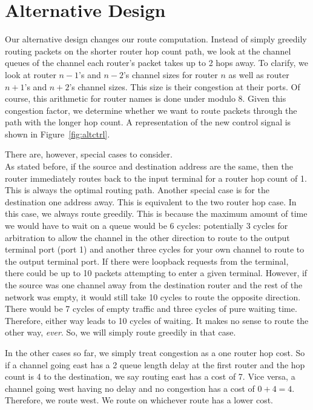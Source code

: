 \documentclass[10pt]{article}
\begin{document}
\section{Alternative Design}

Our alternative design changes our route computation. 
Instead of simply greedily routing packets on the shorter router hop count
path, we look at the channel queues of the channel each router's packet 
takes up to 2 hops away. 
To clarify, we look at router $n-1$'s and $n-2$'s channel sizes 
for router $n$ as well as router $n+1$'s and $n+2$'s channel sizes.
This size is their congestion at their ports. 
Of course, this arithmetic for router names is done under modulo 8. 
Given this congestion factor, we determine whether we want to route packets 
through the path with the longer hop count. 
A representation of the new control signal is shown in 
Figure~\ref{fig:altctrl}.\par

There are, however, special cases to consider. \\
As stated before, if the source and destination address are the same, then the
router immediately routes back to the input terminal for a router hop count 
of 1.
This is always the optimal routing path.
Another special case is for the destination one address away. 
This is equivalent to the two router hop case.
In this case, we always route greedily. 
This is because the maximum amount of time we would have to wait on a queue
would be 6 cycles: 
potentially 3 cycles for arbitration to allow the channel in the other 
direction to route to the output terminal port (port 1) and another three
cycles for your own channel to route to the output terminal port.
If there were loopback requests from the terminal, there could be up to 10 
packets attempting to enter a given terminal.
However, if the source was one channel away from the destination router and the
rest of the network was empty, it would still take 10 cycles to route the 
opposite direction. 
There would be 7 cycles of empty traffic and three cycles of pure waiting time.
Therefore, either way leads to 10 cycles of waiting.
It makes no sense to route the other way, \textit{ever}.
So, we will simply route greedily in that case. \par

In the other cases so far, we simply treat congestion as a one router hop 
cost.
So if a channel going east has a 2 queue length delay at the first router 
and the hop count is 4 to the destination, we say routing east has a cost of 7.
Vice versa, a channel going west having no delay and no congestion has a cost
of $ 0 + 4 =4 $. 
Therefore, we route west. 
We route on whichever route has a lower cost. \par
\end{document}
